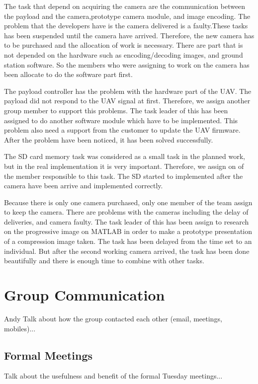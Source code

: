 The task that depend on acquiring the camera are the communication between the payload and the camera,prototype camera module, and image encoding. The problem that the developers have is the camera delivered is a faulty.These tasks has been suspended until the camera have arrived.  Therefore, the new camera has to be purchased and the allocation of work is necessary. There are part that is not depended on the hardware such as encoding/decoding images, and ground station software. So the members who were assigning to work on the camera has been allocate to do the software part first.

The payload controller has the problem with the hardware part of the UAV. The payload did not respond to the UAV signal at first. Therefore, we assign another group member to support this problems. The task leader of this has been assigned to do another software module which have to be implemented. This problem also need a support from the customer to update the UAV firmware. After the problem have been noticed, it has been solved successfully. 

The SD card memory task was considered as a small task in the planned work, but in the real implementation it is very important. Therefore, we assign on of the member responsible to this task. The SD started to implemented after the camera have been arrive and implemented correctly. 

Because there is only one camera purchased, only one member of the team assign to keep the camera. There are problems with the cameras including the delay of deliveries, and camera faulty. The task leader of this has been assign to research on the progressive image on MATLAB in order to make a prototype presentation of a compression image taken. The task has been delayed from the time set to an individual. But after the second working camera arrived, the task has been done beautifully and there is enough time to combine with other tasks.



\section{Group Communication}
Andy
Talk about how the group contacted each other (email, meetings, mobiles)...



\subsection{Formal Meetings}
Talk about the usefulness and benefit of the formal Tuesday meetings...

